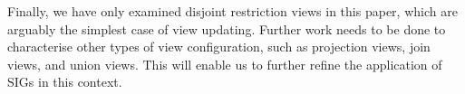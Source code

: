 \documentclass{sig-alternate-05-2015}
\begin{document}
Finally, we have only examined disjoint restriction views in this paper, which are arguably the simplest case of view updating. Further work needs to be done to characterise other types of view configuration, such as projection views, join views, and union views. This will enable us to further refine the application of SIGs in this context.




\balance






\end{document}
